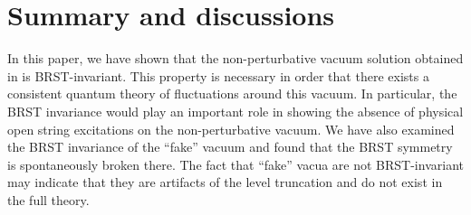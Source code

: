 \documentclass[a4paper,12pt]{article}
\begin{document}
\section{Summary and discussions}
\label{sec:conc.}

In this paper, we have shown that the non-perturbative vacuum solution
obtained in \cite{SZ,Moeller:2000xv} is BRST-invariant.
This property is necessary in order that there exists a consistent
quantum theory of fluctuations around this vacuum.
In particular, the BRST invariance would play an important role in
showing the absence of physical open string excitations on the
non-perturbative vacuum.
We have also examined the BRST invariance of the ``fake'' vacuum and
found that the BRST symmetry is spontaneously broken there.
The fact that ``fake'' vacua are not BRST-invariant may indicate that
they are artifacts of the  level truncation and do not exist in the
full theory.
\end{document}
